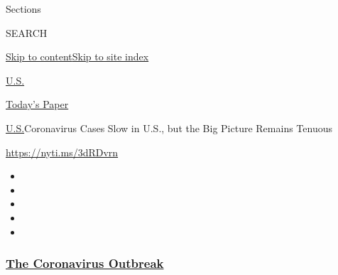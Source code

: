 Sections

SEARCH

\protect\hyperlink{site-content}{Skip to
content}\protect\hyperlink{site-index}{Skip to site index}

\href{https://www.nytimes3xbfgragh.onion/section/us}{U.S.}

\href{https://myaccount.nytimes3xbfgragh.onion/auth/login?response_type=cookie\&client_id=vi}{}

\href{https://www.nytimes3xbfgragh.onion/section/todayspaper}{Today's
Paper}

\href{/section/us}{U.S.}\textbar{}Coronavirus Cases Slow in U.S., but
the Big Picture Remains Tenuous

\url{https://nyti.ms/3dRDvrn}

\begin{itemize}
\item
\item
\item
\item
\item
\end{itemize}

\hypertarget{the-coronavirus-outbreak}{%
\subsubsection{\texorpdfstring{\href{https://www.nytimes3xbfgragh.onion/news-event/coronavirus?name=styln-coronavirus-national\&region=TOP_BANNER\&block=storyline_menu_recirc\&action=click\&pgtype=Article\&impression_id=817df6d0-f4b7-11ea-bfcd-b5364c666c0c\&variant=undefined}{The
Coronavirus
Outbreak}}{The Coronavirus Outbreak}}\label{the-coronavirus-outbreak}}

